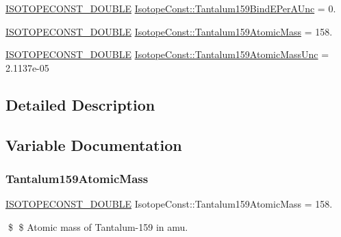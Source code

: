 \begin{DoxyCompactItemize}
\mbox{\hyperlink{group___isotope_const-_macros_ga8f45a7272ce02c0b4c65c44636ed719a}{I\+S\+O\+T\+O\+P\+E\+C\+O\+N\+S\+T\+\_\+\+D\+O\+U\+B\+LE}} \mbox{\hyperlink{group___isotope_const-_tantalum-_ta159_ga468ce1fbf8239bbcafb7ce52e571ceea}{Isotope\+Const\+::\+Tantalum159\+Bind\+E\+Per\+A\+Unc}} = 0.
\item 
\mbox{\hyperlink{group___isotope_const-_macros_ga8f45a7272ce02c0b4c65c44636ed719a}{I\+S\+O\+T\+O\+P\+E\+C\+O\+N\+S\+T\+\_\+\+D\+O\+U\+B\+LE}} \mbox{\hyperlink{group___isotope_const-_tantalum-_ta159_ga58007b58b735abb4c28325b8edeb0ced}{Isotope\+Const\+::\+Tantalum159\+Atomic\+Mass}} = 158.
\item 
\mbox{\hyperlink{group___isotope_const-_macros_ga8f45a7272ce02c0b4c65c44636ed719a}{I\+S\+O\+T\+O\+P\+E\+C\+O\+N\+S\+T\+\_\+\+D\+O\+U\+B\+LE}} \mbox{\hyperlink{group___isotope_const-_tantalum-_ta159_gad43319f5c700f863107e89c88631bcdf}{Isotope\+Const\+::\+Tantalum159\+Atomic\+Mass\+Unc}} = 2.\+1137e-\/05
\end{DoxyCompactItemize}


\subsection{Detailed Description}


\subsection{Variable Documentation}
\mbox{\label{group___isotope_const-_tantalum-_ta159_ga58007b58b735abb4c28325b8edeb0ced}} 
\subsubsection{\texorpdfstring{Tantalum159\+Atomic\+Mass}{Tantalum159AtomicMass}}
{\footnotesize\ttfamily \mbox{\hyperlink{group___isotope_const-_macros_ga8f45a7272ce02c0b4c65c44636ed719a}{I\+S\+O\+T\+O\+P\+E\+C\+O\+N\+S\+T\+\_\+\+D\+O\+U\+B\+LE}} Isotope\+Const\+::\+Tantalum159\+Atomic\+Mass = 158.}

\$ \$ Atomic mass of Tantalum-\/159 in amu. \mbox{\label{group___isotope_const-_tantalum-_ta159_gad43319f5c700f863107e89c88631bcdf}} 
